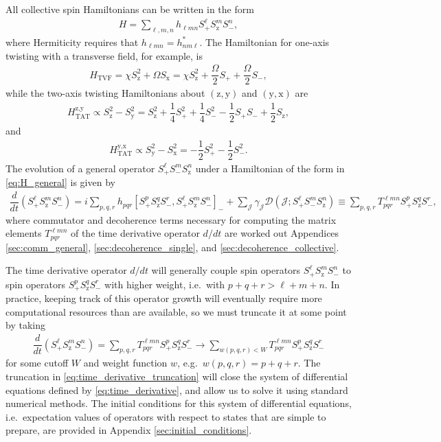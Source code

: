 \documentclass[aps,notitlepage,nofootinbib,11pt]{revtex4-1}
\renewcommand{\t}{\text} %
\newcommand{\f}[2]{\dfrac{#1}{#2}} %
\newcommand{\p}[1]{\left(#1\right)} %
\renewcommand{\sp}[1]{\left[#1\right]} %
\newcommand{\D}{\mathcal{D}}
\newcommand{\J}{\mathcal{J}}
\newcommand{\z}{\text{z}}
\newcommand{\x}{\text{x}}
\newcommand{\y}{\text{y}}
\newcommand{\1}{\mathds{1}}
\begin{document}
All collective spin Hamiltonians can be written in the form
\begin{align}
  H = \sum_{\ell,m,n} h_{\ell mn} S_+^\ell S_\z^m S_-^n,
  \label{eq:H_general}
\end{align}
where Hermiticity requires that $h_{\ell mn}=h_{nm\ell}^*$.  The
Hamiltonian for one-axis twisting with a transverse field, for
example, is
\begin{align}
  H_{\t{TVF}}
  = \chi S_\z^2 + \Omega S_\x
  = \chi S_\z^2 + \f{\Omega}{2} S_+ + \f{\Omega}{2} S_-,
\end{align}
while the two-axis twisting Hamiltonians about $\p{\z,\y}$ and
$\p{\y,\x}$ are
\begin{align}
  H_{\t{TAT}}^{\z,\y}
  \propto S_\z^2 - S_\y^2
  = S_\z^2 + \f14 S_+^2 + \f14 S_-^2
  - \f12 S_+ S_- + \f12 S_\z,
\end{align}
and
\begin{align}
  H_{\t{TAT}}^{\y,\x}
  \propto S_\y^2 - S_\x^2
  = -\f12 S_+^2 - \f12 S_-^2.
\end{align}
The evolution of a general operator $S_+^\ell S_-^m S_\z^n$ under a
Hamiltonian of the form in \eqref{eq:H_general} is given by
\begin{align}
  \f{d}{dt} \p{S_+^\ell S_\z^m S_-^n}
  = i \sum_{p,q,r} h_{pqr}
  \sp{S_+^p S_\z^q S_-^r, S_+^\ell S_\z^m S_-^n}_-
  + \sum_\J \gamma_\J \D\p{\J; S_+^\ell S_-^m S_\z^n}
  \equiv \sum_{p,q,r} T^{\ell m n}_{pqr} S_+^p S_\z^q S_-^r,
  \label{eq:time_derivative}
\end{align}
where commutator and decoherence terms necessary for computing the
matrix elements $T^{\ell m n}_{pqr}$ of the time derivative operator
$d/dt$ are worked out Appendices \ref{sec:comm_general},
\ref{sec:decoherence_single}, and \ref{sec:decoherence_collective}.

The time derivative operator $d/dt$ will generally couple spin
operators $S_+^\ell S_\z^m S_-^n$ to spin operators
$S_+^p S_\z^q S_-^r$ with higher weight, i.e.~with $p+q+r>\ell+m+n$.
In practice, keeping track of this operator growth will eventually
require more computational resources than are available, so we must
truncate it at some point by taking
\begin{align}
  \f{d}{dt} \p{S_+^\ell S_\z^m S_-^n}
  = \sum_{p,q,r} T^{\ell m n}_{pqr} S_+^p S_\z^q S_-^r
  \to \sum_{w\p{p,q,r}<W} T^{\ell m n}_{pqr} S_+^p S_\z^q S_-^r
  \label{eq:time_derivative_truncation}
\end{align}
for some cutoff $W$ and weight function $w$, e.g.~$w\p{p,q,r}=p+q+r$.
The truncation in \eqref{eq:time_derivative_truncation} will close the
system of differential equations defined by
\eqref{eq:time_derivative}, and allow us to solve it using standard
numerical methods.  The initial conditions for this system of
differential equations, i.e.~expectation values of operators with
respect to states that are simple to prepare, are provided in Appendix
\ref{sec:initial_conditions}.
\end{document}
